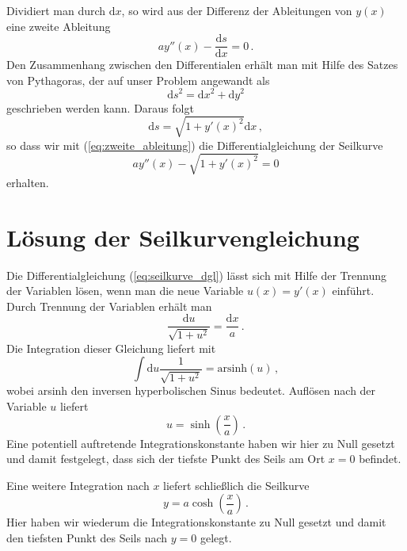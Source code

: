 \documentclass[twocolumn,aps]{revtex4}
\begin{document}
Dividiert man durch $\mathrm{d}x$, so wird aus der Differenz der
Ableitungen von $y(x)$ eine zweite Ableitung
\begin{equation}
 ay''(x)-\frac{\mathrm{d}s}{\mathrm{d}x} = 0\,.
 \label{eq:zweite_ableitung}
\end{equation}
Den Zusammenhang zwischen den Differentialen erhält man mit Hilfe des
Satzes von Pythagoras, der auf unser Problem angewandt als
\begin{equation}
 \mathrm{d}s^2 = \mathrm{d}x^2+\mathrm{d}y^2
\end{equation}
geschrieben werden kann. Daraus folgt
\begin{equation}
 \mathrm{d}s = \sqrt{1+y'(x)^2}\mathrm{d}x\,,
 \label{eq:ds}
\end{equation}
so dass wir mit (\ref{eq:zweite_ableitung}) die Differentialgleichung
der Seilkurve
\begin{equation}
 ay''(x)-\sqrt{1+y'(x)^2} = 0
 \label{eq:seilkurve_dgl}
\end{equation}
erhalten.

\section{Lösung der Seilkurvengleichung}
Die Differentialgleichung (\ref{eq:seilkurve_dgl}) lässt sich mit Hilfe der
Trennung der Variablen lösen, wenn man die neue Variable $u(x) = y'(x)$
einführt. Durch Trennung der Variablen erhält man
\begin{equation}
 \frac{\mathrm{d}u}{\sqrt{1+u^2}} = \frac{\mathrm{d}x}{a}\,.
\end{equation}
Die Integration dieser Gleichung liefert mit
\begin{equation}
 \int\mathrm{d}u\frac{1}{\sqrt{1+u^2}} = \mathrm{arsinh}(u)\,,
\end{equation}
wobei arsinh den inversen hyperbolischen Sinus bedeutet. Auflösen nach der
Variable $u$ liefert
\begin{equation}
 u = \sinh\left(\frac{x}{a}\right)\,.
 \label{eq:seilkurve_u}
\end{equation}
Eine potentiell auftretende Integrationskonstante haben wir hier zu Null
gesetzt und damit festgelegt, dass sich der tiefste Punkt des Seils am
Ort $x=0$ befindet.

Eine weitere Integration nach $x$ liefert schließlich die Seilkurve
\begin{equation}
 y= a\cosh\left(\frac{x}{a}\right)\,.
 \label{eq:seilkurve}
\end{equation}
Hier haben wir wiederum die Integrationskonstante zu Null gesetzt und
damit den tiefsten Punkt des Seils nach $y=0$ gelegt.
\end{document}
